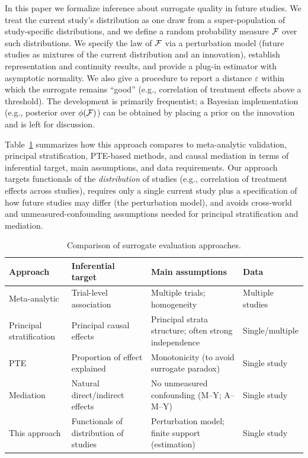 \documentclass{article}
\begin{document}
In this paper we formalize inference about surrogate quality in future studies. We treat the current study's distribution as one draw from a super-population of study-specific distributions, and we define a random probability measure $\mathcal{F}$ over such distributions. We specify the law of $\mathcal{F}$ via a perturbation model (future studies as mixtures of the current distribution and an innovation), establish representation and continuity results, and provide a plug-in estimator with asymptotic normality. We also give a procedure to report a distance $\varepsilon$ within which the surrogate remains ``good'' (e.g., correlation of treatment effects above a threshold). The development is primarily frequentist; a Bayesian implementation (e.g., posterior over $\phi(\mathcal{F})$) can be obtained by placing a prior on the innovation and is left for discussion.

Table~\ref{tab:comparison} summarizes how this approach compares to meta-analytic validation, principal stratification, PTE-based methods, and causal mediation in terms of inferential target, main assumptions, and data requirements. Our approach targets functionals of the \emph{distribution} of studies (e.g., correlation of treatment effects across studies), requires only a single current study plus a specification of how future studies may differ (the perturbation model), and avoids cross-world and unmeasured-confounding assumptions needed for principal stratification and mediation.

\begin{table}[htbp]
\centering
\caption{Comparison of surrogate evaluation approaches.}
\label{tab:comparison}
\begin{tabular}{llll}
\toprule
Approach & Inferential target & Main assumptions & Data \\
\midrule
Meta-analytic \cite{buyse2000validation} & Trial-level association & Multiple trials; homogeneity & Multiple studies \\
Principal stratification \cite{frangakis2002principal} & Principal causal effects & Principal strata structure; often strong independence & Single/multiple \\
PTE \cite{chen2003pte} & Proportion of effect explained & Monotonicity (to avoid surrogate paradox) & Single study \\
Mediation \cite{vanderweele2015mediation} & Natural direct/indirect effects & No unmeasured confounding (M--Y; A--M--Y) & Single study \\
This approach & Functionals of distribution of studies & Perturbation model; finite support (estimation) & Single study \\
\bottomrule
\end{tabular}
\end{table}
\end{document}
